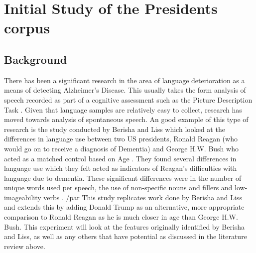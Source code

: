 \documentclass[10pt, letterpaper, twoside, openany]{book}
\begin{document}
\chapter{Initial Study of the Presidents corpus}
\section{Background}
There has been a significant research in the area of language deterioration as a means of detecting Alzheimer's Disease. This usually takes the form analysis of speech recorded as part of a cognitive assessment such as the Picture Description Task \cite{Orimaye2008}. Given that language samples are relatively easy to collect, research has moved towards analysis of spontaneous speech. An good example of this type of research is the study conducted by Berisha and Liss which looked at the differences in language use between two US presidents, Ronald Reagan (who would go on to receive a diagnosis of Dementia) and George H.W. Bush who acted as a matched control based on Age \cite{Berisha2015}. They found several differences in language use which they felt acted as indicators of Reagan's difficulties with language due to dementia. These significant differences were in the number of unique words used per speech, the use of non-specific nouns and fillers and low-imageability verbs \cite{Berisha2015}. 
/par   
This study replicates work done by Berisha and Liss and extends this by adding Donald Trump as an alternative, more appropriate comparison to Ronald Reagan as he is much closer in age than George H.W. Bush. This experiment will look at the features originally identified by Berisha and Liss, as well as any others that have potential as discussed in the literature review above. 
\end{document}
